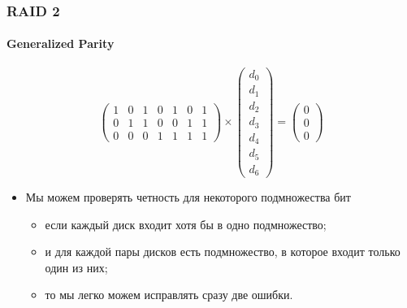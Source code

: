 \begin{frame}
\frametitle{RAID 2}
\framesubtitle{Generalized Parity}
\[
  \left(
    \begin{array}{ccccccc}
      1 & 0 & 1 & 0 & 1 & 0 & 1 \\
      0 & 1 & 1 & 0 & 0 & 1 & 1 \\
      0 & 0 & 0 & 1 & 1 & 1 & 1
    \end{array}
  \right) \times \left(
    \begin{array}{c}
      d_0 \\
      d_1 \\
      d_2 \\
      d_3 \\
      d_4 \\
      d_5 \\
      d_6
    \end{array}
  \right) = \left(
    \begin{array}{c}
      0 \\
      0 \\
      0
    \end{array}
  \right)
\]
\begin{itemize}
  \item Мы можем проверять четность для некоторого подмножества бит
  \begin{itemize}
    \item если каждый диск входит хотя бы в одно подмножество;
    \item и для каждой пары дисков есть подмножество, в которое входит только
    один из них;
    \item то мы легко можем исправлять сразу две ошибки.
  \end{itemize}
\end{itemize}
\end{frame}

